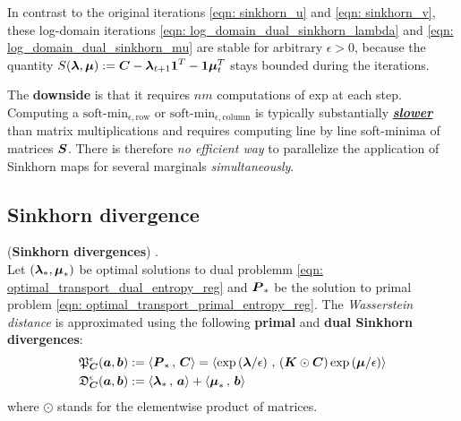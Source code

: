 \documentclass[11pt]{article}
\begin{document}
In contrast to the original iterations \eqref{eqn: sinkhorn_u} and  \eqref{eqn: sinkhorn_v}, these log-domain iterations \eqref{eqn: log_domain_dual_sinkhorn_lambda} and \eqref{eqn: log_domain_dual_sinkhorn_mu} are stable for arbitrary $\epsilon > 0$, because the quantity $S(\boldsymbol{\lambda},\boldsymbol{\mu}) := \boldsymbol{C} - \boldsymbol{\lambda}_{t+1}\boldsymbol{1}^{T}- \boldsymbol{1}\boldsymbol{\mu}_{t}^{T}$ stays bounded during the iterations. 

The \textbf{downside} is that it requires $nm$ computations of exp at each step. Computing a $\text{soft-min}_{\epsilon, \text{row}}$ or $\text{soft-min}_{\epsilon, \text{column}}$  is typically substantially \underline{\textbf{\emph{slower}}} than matrix multiplications and requires computing line by line soft-minima of matrices $\boldsymbol{S}$.  There is therefore \emph{no efficient way} to parallelize the application of Sinkhorn maps for several marginals \emph{simultaneously}.

\subsection{Sinkhorn divergence}
\begin{definition}(\textbf{Sinkhorn divergences}) \citep{cuturi2013sinkhorn, gabriel2019computational}.\\
Let $(\boldsymbol{\lambda}_{*}, \boldsymbol{\mu}_{*})$ be optimal solutions to dual problemm \eqref{eqn: optimal_transport_dual_entropy_reg} and $\boldsymbol{P}_{*}$ be the solution to primal problem \eqref{eqn: optimal_transport_primal_entropy_reg}. The \emph{Wasserstein distance} is approximated using the following \textbf{primal} and \textbf{dual Sinkhorn divergences}:
\begin{align}
\mathfrak{P}_{\boldsymbol{C}}^{\epsilon}(\boldsymbol{a}, \boldsymbol{b}) &:= \left\langle \boldsymbol{P}_{*}\,,\, \boldsymbol{C} \right\rangle = \left\langle \exp\left(\boldsymbol{\lambda}/\epsilon\right)\,,\, (\boldsymbol{K}\odot \boldsymbol{C})\exp\left(\boldsymbol{\mu}/\epsilon\right) \right\rangle \label{eqn: sinkhorn_primal_divg}\\
\mathfrak{D}_{\boldsymbol{C}}^{\epsilon}(\boldsymbol{a}, \boldsymbol{b}) &:=\left\langle \boldsymbol{\lambda}_{*}\,,\, \boldsymbol{a} \right\rangle + \left\langle \boldsymbol{\mu}_{*}\,,\, \boldsymbol{b} \right\rangle \label{eqn: sinkhorn_dual_divg}
\end{align} where $\odot$ stands for the elementwise product of matrices.
\end{definition}
\end{document}
